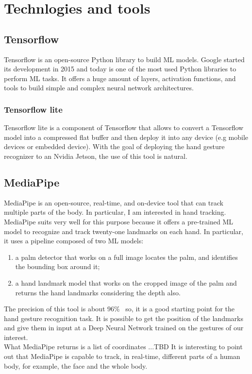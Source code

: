 \documentclass[../thesis.tex]{subfiles}
\begin{document}
\chapter{Technlogies and tools}\label{cap:technologies-and-tools}

\section{Tensorflow}
Tensorflow is an open-source Python library to build \acrshort{ML} models. Google started its development in 2015 and today is one of the most used Python libraries to perform \acrshort{ML} tasks. It offers a huge amount of layers, activation functions, and tools to build simple and complex neural network architectures.

\subsection{Tensorflow lite}
Tensorflow lite is a component of Tensorflow that allows to convert a Tensorflow model into a compressed flat buffer and then deploy it into any device (e.g mobile devices or embedded device). With the goal of deploying the hand gesture recognizer to an Nvidia Jetson, the use of this tool is natural.

\section{MediaPipe}\label{sec:mediapipe}
MediaPipe is an open-source, real-time, and on-device tool that can track multiple parts of the body. In particular, I am interested in hand tracking. MediaPipe suits very well for this purpose because it offers a pre-trained \acrshort{ML} model to recognize and track twenty-one landmarks on each hand. In particular, it uses a pipeline composed of two \acrshort{ML} models:
\begin{enumerate}
    \item a palm detector that works on a full image locates the palm, and identifies the bounding box around it;
    \item a hand landmark model that works on the cropped image of the palm and returns the hand landmarks considering the depth also. 
\end{enumerate}
The precision of this tool is about $96\%$~\cite{article:mediapipe} so, it is a good starting point for the hand gesture recognition task. It is possible to get the position of the landmarks and give them in input at a Deep Neural Network trained on the gestures of our interest.\\
What MediaPipe returns is a list of coordinates ...TBD
It is interesting to point out that MediaPipe is capable to track, in real-time, different parts of a human body, for example, the face and the whole body.~\cite{site:mediapipe}
\end{document}
